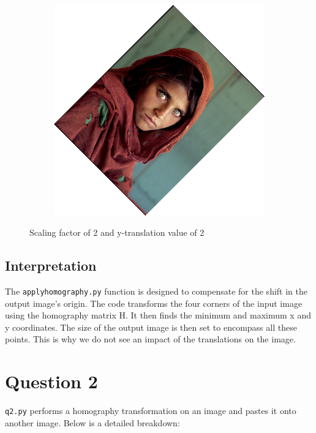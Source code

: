 \documentclass{article}
\begin{document}
\begin{figure}[H]
\begin{subfigure}{.3\textwidth}
    \end{subfigure}
    \begin{subfigure}{.3\textwidth}
        \centering
        \includegraphics[scale=0.04]{q1/output/similar_2_2_2.jpg}
    \end{subfigure}
    \caption{Scaling factor of 2 and y-translation value of 2}
\end{figure}

\subsection{Interpretation}
The \texttt{applyhomography.py} function is designed to compensate for the shift in the output image's origin. The code transforms the four corners of the input image using the homography matrix H. 
It then finds the minimum and maximum x and y coordinates. The size of the output image is then set to encompass all these points. 
This is why we do not see an impact of the translations on the image. 

\section{Question 2}
\texttt{q2.py} performs a homography transformation on an image and pastes it onto another image. Below is a detailed breakdown:
\end{document}
